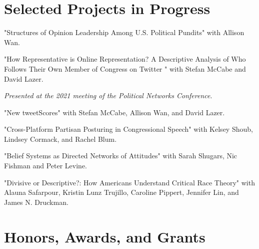 \documentclass[letterpaper]{article}
\renewenvironment{itemize}{
  \begin{list}{}{
    \setlength{\leftmargin}{1.5em}
  }
}{
  \end{list}
}
\begin{document}
\section*{Selected Projects in Progress}

\begin{itemize}
\item "Structures of Opinion Leadership Among U.S. Political Pundits" with Allison Wan.

\item "How Representative is Online Representation? A Descriptive Analysis of Who Follows Their Own Member of Congress on Twitter " with Stefan McCabe and David Lazer.
\begin{itemize}
\item \textit{Presented at the 2021 meeting of the Political Networks Conference}.
\end{itemize} 

\item "New tweetScores" with Stefan McCabe, Allison Wan, and David Lazer.

\item "Cross-Platform Partisan Posturing in Congressional Speech" with Kelsey Shoub, Lindsey Cormack, and Rachel Blum.

\item "Belief Systems as Directed Networks of Attitudes" with Sarah Shugars, Nic Fishman and Peter Levine.

\item "Divisive or Descriptive?: How Americans Understand Critical Race Theory" with Alauna Safarpour, Kristin Lunz Trujillo, Caroline Pippert, Jennifer Lin, and James N. Druckman.

\end{itemize}

\section*{Honors, Awards, and Grants}
\end{document}
